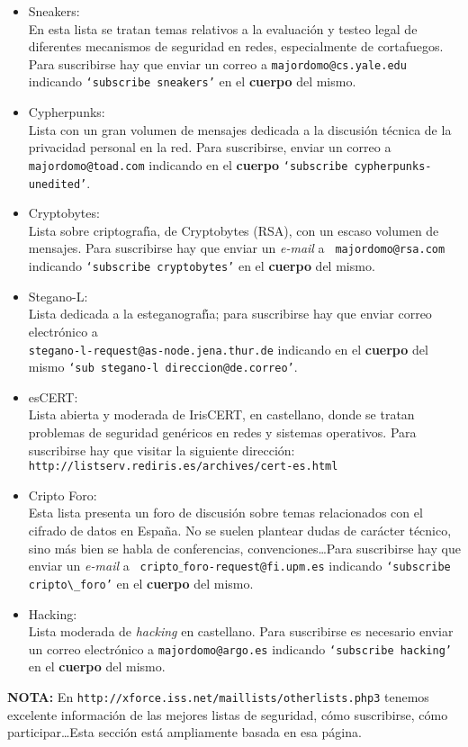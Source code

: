 \begin{itemize}
{`subscribe uninfsec'} en el cuerpo del mismo.
\item Sneakers:\\
En esta lista se tratan temas relativos a la evaluaci\'on y testeo legal de
diferentes mecanismos de seguridad en redes, especialmente de cortafuegos. Para
suscribirse hay que enviar un correo a {\tt majordomo@cs.yale.edu} indicando
{\tt `subscribe sneakers'} en el {\bf cuerpo} del mismo.
\item Cypherpunks:\\
Lista con un gran volumen de mensajes dedicada a la discusi\'on t\'ecnica de la 
privacidad personal en la red. Para suscribirse, enviar un correo a {\tt
majordomo@toad.com} indicando en el {\bf cuerpo} {\tt `subscribe 
cypherpunks-unedited'}.
\item Cryptobytes:\\
Lista sobre criptograf\'{\i}a, de Cryptobytes (RSA), con un escaso volumen de
mensajes. Para suscribirse hay que enviar un {\it e-mail} a {\tt 
majordomo@rsa.com} indicando {\tt `subscribe\\ cryptobytes'} en el {\bf cuerpo}
del mismo.
\item Stegano-L:\\
Lista dedicada a la esteganograf\'{\i}a; para suscribirse hay que enviar correo
electr\'onico a {\tt \\ stegano-l-request@as-node.jena.thur.de} indicando en
el {\bf cuerpo} del mismo {\tt `sub\\ stegano-l direccion@de.correo'}.
\item esCERT:\\
Lista abierta y moderada de IrisCERT, en castellano, donde se tratan problemas 
de seguridad
gen\'ericos en redes y sistemas operativos. Para suscribirse hay que visitar la
siguiente direcci\'on:\\
{\tt http://listserv.rediris.es/archives/cert-es.html}
\item Cripto Foro:\\
Esta lista presenta un foro de discusi\'on sobre temas relacionados con el 
cifrado de datos en Espa\~na. No se suelen plantear dudas de car\'acter 
t\'ecnico, sino m\'as bien se habla de conferencias, convenciones\ldots Para
suscribirse hay que enviar un {\it e-mail} a {\tt 
cripto$\_$foro-request@fi.upm.es} indicando {\tt `subscribe cripto$\_$foro'} en 
el {\bf cuerpo} del mismo.
\item Hacking:\\
Lista moderada de {\it hacking} en castellano. Para suscribirse es necesario
enviar un
correo electr\'onico a {\tt majordomo@argo.es} indicando {\tt `subscribe 
hacking'} en el {\bf cuerpo} del mismo.
\end{itemize}
{\bf NOTA:} En {\tt http://xforce.iss.net/maillists/otherlists.php3} tenemos 
excelente informaci\'on de las mejores listas de seguridad, c\'omo suscribirse,
c\'omo participar\ldots Esta secci\'on est\'a ampliamente basada en esa 
p\'agina.
